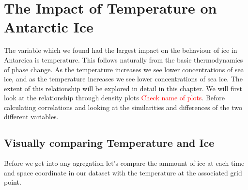 \documentclass[../main.tex]{subfiles}
\begin{document}
\chapter{The Impact of Temperature on Antarctic Ice}

The variable which we found had the largest impact on the behaviour of ice in Antarcica is temperature. This follows naturally from the basic thermodynamics of phase change. As the temperature increases we see lower concentrations of sea ice, and as the temperature increases we see lower concentrations of sea ice. The extent of this relationship will be explored in detail in this chapter. We will first look at the relationship through density plots \textcolor{red}{Check name of plots}. Before calculating correlations and looking at the similarities and differences of the two different variables.


\section{Visually comparing Temperature and Ice}
Before we get into any agregation let's compare the ammount of ice at each time and space coordinate in our dataset with the temperature at the associated grid point.

\begin{figure}[H]
\centering
{}
\end{figure}
\end{document}
